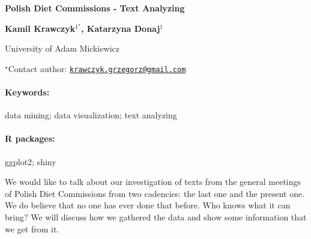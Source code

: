 \documentclass[11pt, a4paper]{article}
\renewcommand{\title}[1]{\begin{center}{\bf \LARGE #1}\end{center}}
\newcommand{\keywords}{\paragraph{Keywords:}}
\newcommand{\packages}{\paragraph{R packages:}}
\begin{document}
\pagestyle{empty}

\title{Polish Diet Commissions - Text Analyzing}

\begin{center}
  {\bf Kamil Krawczyk$^{1^\star}$, Katarzyna Donaj$^{1}$}
\end{center}

\vskip 0.3cm

\begin{affiliations}
\begin{enumerate}
\begin{minipage}{0.915\textwidth}
\centering
\item University of Adam Mickiewicz \\[-2pt]
\end{minipage}
\end{enumerate}
$^\star$Contact author: \href{mailto:krawczyk.grzegorz@gmail.com}{\nolinkurl{krawczyk.grzegorz@gmail.com}}\\
\end{affiliations}

\vskip 0.5cm

\begin{minipage}{0.915\textwidth}
\keywords data mining; data visualization; text analyzing
\packages ggplot2; shiny
\end{minipage}

\vskip 0.8cm

We would like to talk about our investigation of texts from the general
meetings of Polish Diet Commissions from two cadencies: the last one and
the present one. We do believe that no one has ever done that before.
Who knows what it can bring? We will discuss how we gathered the data
and show some information that we get from it.
\end{document}
